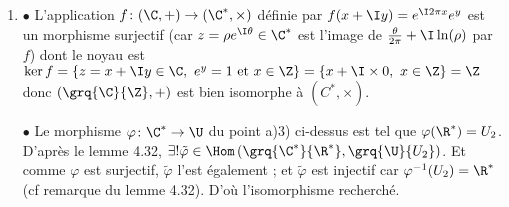 \begin{enumerate}
  \item $\bullet$ L'application $f\colon (\C,+)\to (\C^*,\times)$ définie par $f(x+\I y) = e^{\I 2\pi x} e^y$ est un morphisme surjectif (car $z = \rho e^{\I \theta}\in \C^*$ est l'image de $\frac{\theta}{2\pi}+\I \ln(\rho)$ par $f$) dont le noyau est $\ker f = \{z=x+\I y\in \C,~ e^y = 1 \text{ et } x\in \Z \} = \{x + \I\times 0,~ x\in \Z \} = \Z$ donc $(\grq{\C}{\Z},+)$ est bien isomorphe à $(C^*,\times)$.

  $\bullet$ Le morphisme $\varphi\colon \C^*\to \U$ du point a)3) ci-dessus est tel que $\varphi(\R^*) = U_2$. D'après le lemme 4.32, $\exists ! \tilde{\varphi} \in \Hom\left( \grq{\C^*}{\R^*}, \grq{\U}{U_2}\right)$. Et comme $\varphi$ est surjectif, $\tilde{\varphi}$ l'est également ; et $\tilde{\varphi}$ est injectif car $\varphi^{-1}(U_2) = \R^*$ (cf remarque du lemme 4.32). D'où l'isomorphisme recherché.
\end{enumerate}

